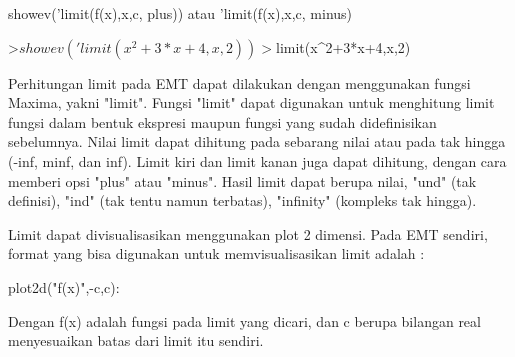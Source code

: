\documentclass[a4paper,10pt]{article}
\begin{document}
\begin{eulernotebook}
\begin{eulercomment}
\begin{eulercomment}
\begin{eulercomment}
\begin{eulercomment}
\begin{eulercomment}
\begin{eulercomment}
\begin{eulercomment}
\begin{eulercomment}
\begin{eulercomment}
\begin{eulercomment}
\begin{eulercomment}
\begin{eulercomment}
\begin{eulercomment}
\begin{eulercomment}
\begin{eulercomment}
\begin{eulercomment}
\begin{eulercomment}
\begin{eulercomment}
\begin{eulercomment}
\begin{eulercomment}
\begin{eulercomment}
\textdollar{}showev('limit(f(x),x,c, plus)) atau 'limit(f(x),x,c, minus)
\end{eulercomment}
\begin{eulerprompt}
>$showev('limit(x^2+3*x+4,x,2))
>$limit(x^2+3*x+4,x,2)
\end{eulerprompt}
\begin{eulercomment}
Perhitungan limit pada EMT dapat dilakukan dengan menggunakan fungsi
Maxima, yakni "limit". Fungsi "limit" dapat digunakan untuk menghitung
limit fungsi dalam bentuk ekspresi maupun fungsi yang sudah
didefinisikan sebelumnya. Nilai limit dapat dihitung pada sebarang
nilai atau pada tak hingga (-inf, minf, dan inf). Limit kiri dan limit
kanan juga dapat dihitung, dengan cara memberi opsi "plus" atau
"minus". Hasil limit dapat berupa nilai, "und" (tak definisi), "ind"
(tak tentu namun terbatas), "infinity" (kompleks tak hingga).

Limit dapat divisualisasikan menggunakan plot 2 dimensi. Pada EMT
sendiri, format yang bisa digunakan untuk memvisualisasikan limit
adalah :

plot2d("f(x)",-c,c):

Dengan f(x) adalah fungsi pada limit yang dicari, dan c berupa
bilangan real menyesuaikan batas dari limit itu sendiri.


\end{eulercomment}
\end{eulercomment}
\end{eulercomment}
\end{eulercomment}
\end{eulercomment}
\end{eulercomment}
\end{eulercomment}
\end{eulercomment}
\end{eulercomment}
\end{eulercomment}
\end{eulercomment}
\end{eulercomment}
\end{eulercomment}
\end{eulercomment}
\end{eulercomment}
\end{eulercomment}
\end{eulercomment}
\end{eulercomment}
\end{eulercomment}
\end{eulercomment}
\end{eulercomment}
\end{eulernotebook}
\end{document}
